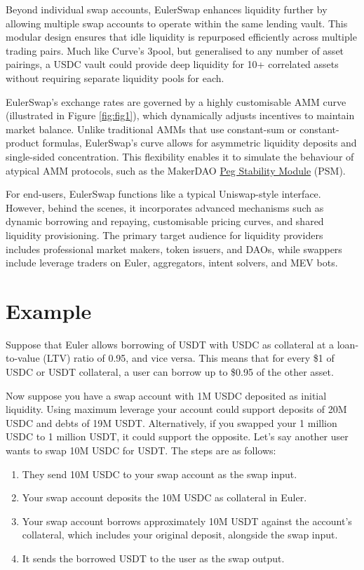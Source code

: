 \documentclass{article}
\begin{document}
Beyond individual swap accounts, EulerSwap enhances liquidity further by allowing multiple swap accounts to operate within the same lending vault. This modular design ensures that idle liquidity is repurposed efficiently across multiple trading pairs. Much like Curve’s 3pool, but generalised to any number of asset pairings, a USDC vault could provide deep liquidity for 10+ correlated assets without requiring separate liquidity pools for each.

EulerSwap’s exchange rates are governed by a highly customisable AMM curve (illustrated in Figure \ref{fig:fig1}), which dynamically adjusts incentives to maintain market balance. Unlike traditional AMMs that use constant-sum or constant-product formulas, EulerSwap’s curve allows for asymmetric liquidity deposits and single-sided concentration. This flexibility enables it to simulate the behaviour of atypical AMM protocols, such as the MakerDAO \href{https://mips.makerdao.com/mips/details/MIP29}{Peg Stability Module} (PSM).

For end-users, EulerSwap functions like a typical Uniswap-style interface. However, behind the scenes, it incorporates advanced mechanisms such as dynamic borrowing and repaying, customisable pricing curves, and shared liquidity provisioning. The primary target audience for liquidity providers includes professional market makers, token issuers, and DAOs, while swappers include leverage traders on Euler, aggregators, intent solvers, and MEV bots. 

\section{Example}

Suppose that Euler allows borrowing of USDT with USDC as collateral at a loan-to-value (LTV) ratio of 0.95, and vice versa. This means that for every \$1 of USDC or USDT collateral, a user can borrow up to \$0.95 of the other asset. 

Now suppose you have a swap account with 1M USDC deposited as initial liquidity. Using maximum leverage your account could support deposits of 20M USDC and debts of 19M USDT. Alternatively, if you swapped your 1 million USDC to 1 million USDT, it could support the opposite. Let’s say another user wants to swap 10M USDC for USDT. The steps are as follows:

\begin{enumerate}
    \item They send 10M USDC to your swap account as the swap input.
    \item Your swap account deposits the 10M USDC as collateral in Euler.
    \item Your swap account borrows approximately 10M USDT against the account's collateral, which includes your original deposit, alongside the swap input.
    \item It sends the borrowed USDT to the user as the swap output.
\end{enumerate}
\end{document}

